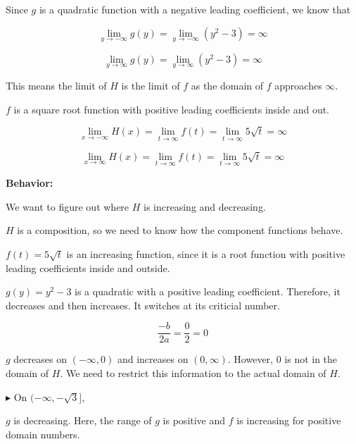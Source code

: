 \documentclass{ximera}
\begin{document}
Since $g$ is a quadratic function with a negative leading coefficient, we know that 

\[
\lim\limits_{y \to -\infty} g(y) = \lim\limits_{y \to -\infty} (y^2 - 3)  = \infty
\]


\[
\lim\limits_{y \to \infty} g(y) = \lim\limits_{y \to \infty} (y^2 - 3)  = \infty
\]

This means the limit of $H$ is the limit of $f$ as the domain of $f$ approaches $\infty$. 


$f$ is a square root function with positive leading coefficients inside and out. 

\[
\lim\limits_{x \to -\infty} H(x) =  \lim\limits_{t \to \infty} f(t)  = \lim\limits_{t \to \infty} 5\sqrt{t} = \infty
\]


\[
\lim\limits_{x \to \infty} H(x) =  \lim\limits_{t \to \infty} f(t)  = \lim\limits_{t \to \infty} 5\sqrt{t} = \infty
\]









\textbf{\textcolor{blue!55!black}{Behavior:}} 


We want to figure out where $H$ is increasing and decreasing. 

$H$ is a composition, so we need to know how the component functions behave. 





$f(t) = 5 \sqrt{t}$ is an increasing function, since it is a root function with positive leading coefficients inside and outside. 

$g(y) = y^2 - 3$ is a quadratic with a positive leading coefficient.  Therefore, it decreases and then increases.   It switches at its criticial number.



\[
\frac{-b}{2 a} = \frac{0}{2} = 0
\]


$g$ decreases on $(-\infty, 0)$ and increases on $(0, \infty)$.  However, $0$ is not in the domain of $H$. We need to restrict this information to the actual domain of $H$. 





\textbf{\textcolor{blue!55!black}{$\blacktriangleright$}} On $(-\infty, -\sqrt{3}]$, 


$g$ is decreasing. Here, the range of $g$ is positive and $f$ is increasing for positive domain numbers. 
\end{document}
